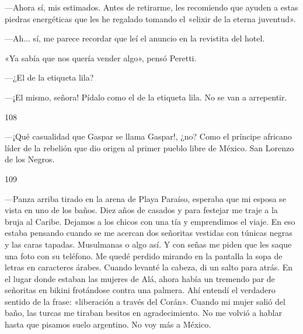 \documentclass[12pt,twoside,openright,a5paper]{book}
\begin{document}
\nopagebreak

---Ahora sí, mis estimados. Antes de retirarme, les recomiendo que ayuden a
estas piedras energéticas que les he regalado tomando el «elixir de la
eterna juventud».

---Ah... sí, me parece recordar que leí el anuncio en la revistita del hotel.

«Ya sabía que nos quería vender algo», pensó Peretti.

---¿El de la etiqueta lila?

---¡El mismo, señora! Pídalo como el de la etiqueta lila. No se van a
arrepentir.

\vspace{0.5cm}

\hrulefill \hspace{0.1cm}\decofourleft\hspace{0.2cm} 108 \hspace{0.2cm}\decofourright \hspace{0.1cm}\hrulefill

\nopagebreak

\vspace{0.5cm}

\nopagebreak

---¡Qué casualidad que Gaspar se llama Gaspar!, ¿no? Como el príncipe africano
líder de la rebelión que dio origen al primer pueblo libre de México. San
Lorenzo de los Negros.

\vspace{0.5cm}

\hrulefill \hspace{0.1cm}\decofourleft\hspace{0.2cm} 109 \hspace{0.2cm}\decofourright \hspace{0.1cm}\hrulefill

\nopagebreak

\vspace{0.5cm}

\nopagebreak

---Panza arriba tirado en la arena de Playa Paraíso, esperaba que mi esposa se
vista en uno de los baños. Diez años de casados y para festejar me traje
a la bruja al Caribe. Dejamos a los chicos con una tía y emprendimos el
viaje. En eso estaba pensando cuando se me acercan dos señoritas vestidas
con túnicas negras y las caras tapadas. Musulmanas o algo así. Y con
señas me piden que les saque una foto con su teléfono. Me quedé perdido
mirando en la pantalla la sopa de letras en caracteres árabes. Cuando levanté
la cabeza, di un salto para atrás. En el lugar donde estaban las mujeres de
Alá, ahora había un tremendo par de señoritas en bikini frotándose contra
una palmera. Ahí entendí el verdadero sentido de la frase: «liberación a
través del Corán». Cuando mi mujer salió del baño, las turcas me tiraban
besitos en agradecimiento. No me volvió a hablar hasta que pisamos suelo
argentino. No voy más a México.
\end{document}
